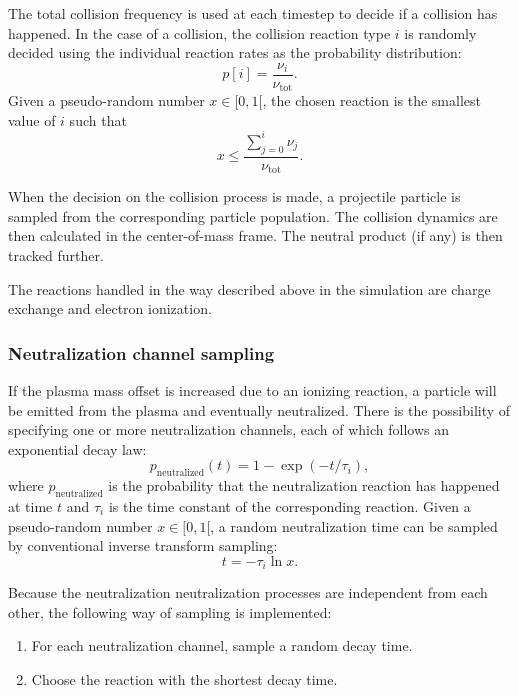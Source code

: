 \documentclass[a4paper,twoside,12pt]{article}
\begin{document}
The total collision frequency is used at each timestep to decide if a collision has happened. In the case of a collision, the collision reaction type $i$ is randomly decided using the individual reaction rates as the probability distribution:
\begin{equation}
    p[i] = \frac{\nu_i}{\nu_\text{tot}}.
\end{equation}
Given a pseudo-random number $x \in [0, 1[$, the chosen reaction is the smallest value of $i$ such that
\[
    x \leq \frac{\sum\limits_{j=0}^i \nu_j}{\nu_\text{tot}}.
\]

When the decision on the collision process is made, a projectile particle is sampled from the corresponding particle population. The collision dynamics are then calculated in the center-of-mass frame. The neutral product (if any) is then tracked further.

The reactions handled in the way described above in the simulation are charge exchange and electron ionization.

\subsubsection{Neutralization channel sampling}
If the plasma mass offset is increased due to an ionizing reaction, a particle will be emitted from the plasma and eventually neutralized. There is the possibility of specifying one or more neutralization channels, each of which follows an exponential decay law:
\begin{equation}
    p_\text{neutralized}(t) = 1 - \exp(-t / \tau_i ),
\end{equation}
where $p_\text{neutralized}$ is the probability that the neutralization reaction has happened at time $t$ and $\tau_i$ is the time constant of the corresponding reaction. Given a pseudo-random number $x \in [0, 1[$, a random neutralization time can be sampled by conventional inverse transform sampling:
\begin{equation}
    t = -\tau_i \ln x.
\end{equation}

Because the neutralization neutralization processes are independent from each other, the following way of sampling is implemented:
\begin{enumerate}
    \item For each neutralization channel, sample a random decay time.
    \item Choose the reaction with the shortest decay time.
\end{enumerate}
\end{document}
